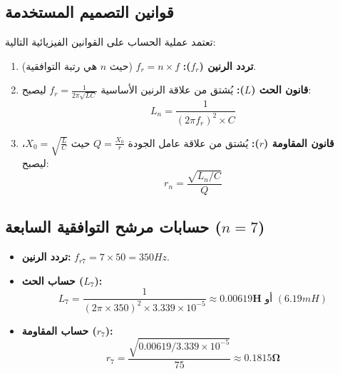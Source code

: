 \documentclass[12pt, a4paper, twoside]{article} %
\begin{document}
\subsection{قوانين التصميم المستخدمة}
تعتمد عملية الحساب على القوانين الفيزيائية التالية:
\begin{enumerate}
    \item \textbf{تردد الرنين ($f_r$):} $f_r = n \times f$ (حيث $n$ هي رتبة التوافقية).
    \item \textbf{قانون الحث ($L$):} يُشتق من علاقة الرنين الأساسية $f_r = \frac{1}{2 \pi \sqrt{LC}}$ ليصبح:
    \begin{equation*}
        L_n = \frac{1}{(2 \pi f_r)^2 \times C}
    \end{equation*}
    \item \textbf{قانون المقاومة ($r$):} يُشتق من علاقة عامل الجودة $Q = \frac{X_0}{r}$ حيث $X_0 = \sqrt{\frac{L}{C}}$، ليصبح:
    \begin{equation*}
        r_n = \frac{\sqrt{L_n / C}}{Q}
    \end{equation*}
\end{enumerate}

\subsection{حسابات مرشح التوافقية السابعة ($n=7$)}
\begin{itemize}
    \item \textbf{تردد الرنين:} $f_{r7} = 7 \times 50 = 350 Hz$.
    \item \textbf{حساب الحث ($L_7$):}
    \begin{equation*}
        L_7 = \frac{1}{(2 \pi \times 350)^2 \times 3.339 \times 10^{-5}} \approx \mathbf{0.00619 H} \text{ أو } (6.19 mH)
    \end{equation*}
    \item \textbf{حساب المقاومة ($r_7$):}
    \begin{equation*}
        r_7 = \frac{\sqrt{0.00619 / 3.339 \times 10^{-5}}}{75} \approx \mathbf{0.1815 \Omega}
    \end{equation*}
\end{itemize}
\end{document}
